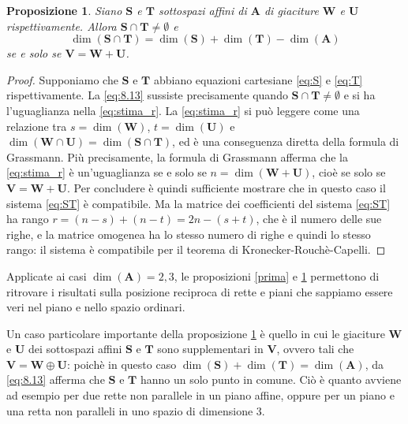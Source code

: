 \documentclass{article}
\theoremstyle{plain}
\newtheorem{prop}[thm]{Proposizione}
\theoremstyle{definition}
\theoremstyle{remark}
\begin{document}
\begin{bxthm}
\begin{prop}\label{seconda}
Siano $\mathbf{S}$ e $\mathbf{T}$ sottospazi affini di $\mathbf{A}$ di giaciture $\mathbf{W}$ e $\mathbf{U}$ rispettivamente. Allora $\mathbf{S}\cap \mathbf{T}\neq\emptyset$ e
\begin{equation}\label{eq:8.13}
\dim(\mathbf{S}\cap \mathbf{T})=\dim(\mathbf{S})+\dim(\mathbf{T})-\dim(\mathbf{A})
\end{equation}
se e solo se $\mathbf{V}=\mathbf{W}+\mathbf{U}$.
\end{prop}
\end{bxthm}
\begin{proof}
Supponiamo che $\mathbf{S}$ e $\mathbf{T}$ abbiano equazioni cartesiane \eqref{eq:S} e \eqref{eq:T} rispettivamente. La \eqref{eq:8.13} sussiste precisamente quando $\mathbf{S}\cap \mathbf{T}\neq\emptyset$ e si ha l'uguaglianza nella \eqref{eq:stima_r}.
La \eqref{eq:stima_r} si può leggere come una relazione tra $s=\dim(\mathbf{W})$, $t=\dim(\mathbf{U})$ e $\dim(\mathbf{W}\cap \mathbf{U})=\dim(\mathbf{S}\cap \mathbf{T})$, ed è una conseguenza diretta della formula di Grassmann. 
Più precisamente, la formula di Grassmann afferma che la \eqref{eq:stima_r} è un'uguaglianza se e solo se $n=\dim(\mathbf{W}+\mathbf{U})$, cioè se solo se $\mathbf{V}=\mathbf{W}+\mathbf{U}$. 
Per concludere è quindi sufficiente mostrare che in questo caso il sistema \eqref{eq:ST} è compatibile. Ma la matrice dei coefficienti del sistema \eqref{eq:ST} ha rango $r=(n-s)+(n-t)=2n-(s+t)$, che è il numero delle sue righe, e la matrice omogenea ha lo stesso numero di righe e quindi lo stesso rango: il sistema è compatibile per il teorema di Kronecker-Rouchè-Capelli.    
\end{proof}

\vspace{10pt}

Applicate ai casi $\dim(\mathbf{A})=2,3$, le proposizioni \ref{prima} e \ref{seconda} permettono di ritrovare i risultati sulla posizione reciproca di rette e piani che sappiamo essere veri nel piano e nello spazio ordinari.

\vspace{10pt}

Un caso particolare importante della proposizione \ref{seconda} è quello in cui le giaciture $\mathbf{W}$ e $\mathbf{U}$ dei sottospazi affini $\mathbf{S}$ e $\mathbf{T}$ sono supplementari in $\mathbf{V}$, ovvero tali che $\mathbf{V}=\mathbf{W}\oplus \mathbf{U}$: poichè in questo caso $\dim(\mathbf{S})+\dim(\mathbf{T})=\dim(\mathbf{A})$, da \eqref{eq:8.13} afferma che $\mathbf{S}$ e $\mathbf{T}$ hanno un solo punto in comune. 
Ciò è quanto avviene ad esempio per due rette non parallele in un piano affine, oppure per un piano e una retta non paralleli in uno spazio di dimensione 3.
\end{document}
